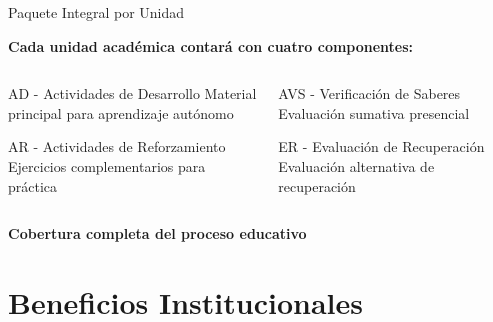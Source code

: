 \documentclass[10pt,aspectratio=169]{beamer}
\begin{document}
\begin{frame}{Paquete Integral por Unidad}
	\begin{center}
		\textbf{Cada unidad académica contará con cuatro componentes:}
	\end{center}
	
	\vspace{0.5cm}
	
	\begin{columns}
		\begin{column}{0.45\textwidth}
			\begin{block}{AD - Actividades de Desarrollo}
				Material principal para aprendizaje autónomo
			\end{block}
			
			\begin{block}{AR - Actividades de Reforzamiento}
				Ejercicios complementarios para práctica
			\end{block}
		\end{column}
		
		\begin{column}{0.45\textwidth}
			\begin{block}{AVS - Verificación de Saberes}
				Evaluación sumativa presencial
			\end{block}
			
			\begin{block}{ER - Evaluación de Recuperación}
				Evaluación alternativa de recuperación
			\end{block}
		\end{column}
	\end{columns}
	
	\vspace{0.5cm}
	
	\begin{center}
		\textcolor{verdeExito}{\textbf{Cobertura completa del proceso educativo}}
	\end{center}
\end{frame}


\section{Beneficios Institucionales}
\end{document}
